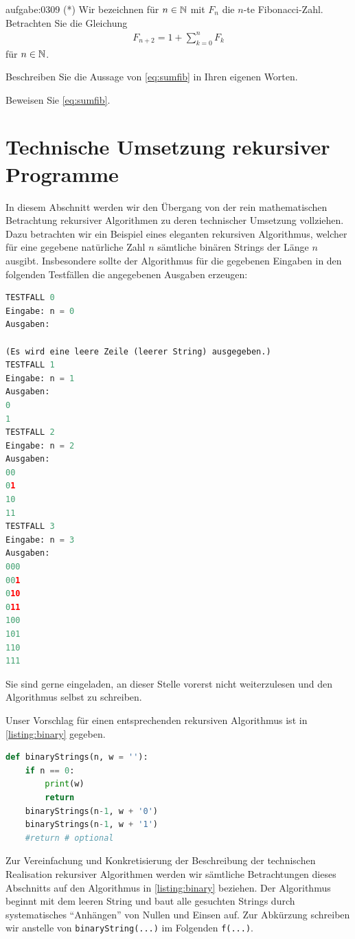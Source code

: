 \begin{aufgabe}{aufgabe:0309}
(*) Wir bezeichnen für $n\in\mathbb{N}$ mit $F_n$ die $n$-te Fibonacci-Zahl. Betrachten Sie die Gleichung
\begin{align}\label{eq:sumfib}
    F_{n+2} = 1 + \sum_{k=0}^{n} F_k
\end{align}
für $n\in\mathbb{N}$.
\begin{aenum}
    \item Beschreiben Sie die Aussage von \cref{eq:sumfib} in Ihren eigenen Worten.
    \item Beweisen Sie \cref{eq:sumfib}.
\end{aenum}
\end{aufgabe}

\clearpage
\section{Technische Umsetzung rekursiver Programme}\label{technisch}
In diesem Abschnitt werden wir den Übergang von der rein mathematischen Betrachtung rekursiver Algorithmen zu deren technischer Umsetzung vollziehen. Dazu betrachten wir ein Beispiel eines eleganten rekursiven Algorithmus, welcher für eine gegebene natürliche Zahl $n$ sämtliche binären Strings der Länge $n$ ausgibt. Insbesondere sollte der Algorithmus für die gegebenen Eingaben in den folgenden Testfällen die angegebenen Ausgaben erzeugen:
\begin{lstlisting}[language=Python,caption=binäre Strings rekursiv ausgeben,numbers=none]
TESTFALL 0
Eingabe: n = 0
Ausgaben:

(Es wird eine leere Zeile (leerer String) ausgegeben.)
TESTFALL 1
Eingabe: n = 1
Ausgaben:
0
1
TESTFALL 2
Eingabe: n = 2
Ausgaben:
00
01
10
11
TESTFALL 3
Eingabe: n = 3
Ausgaben:
000
001
010
011
100
101
110
111
\end{lstlisting}
Sie sind gerne eingeladen, an dieser Stelle vorerst nicht weiterzulesen und den Algorithmus selbst zu schreiben.

Unser Vorschlag für einen entsprechenden rekursiven Algorithmus ist in \cref{listing:binary} gegeben.
\begin{lstlisting}[language=Python,caption=binaryStrings,label=listing:binary]
def binaryStrings(n, w = ''):
    if n == 0:
        print(w)
        return
    binaryStrings(n-1, w + '0')
    binaryStrings(n-1, w + '1')
    #return # optional
\end{lstlisting}
Zur Vereinfachung und Konkretisierung der Beschreibung der technischen Realisation rekursiver Algorithmen werden wir sämtliche Betrachtungen dieses Abschnitts auf den Algorithmus in \cref{listing:binary} beziehen. Der Algorithmus beginnt mit dem leeren String und baut alle gesuchten Strings durch systematisches \enquote{Anhängen} von Nullen und Einsen auf. Zur Abkürzung schreiben wir anstelle von \verb|binaryString(...)| im Folgenden \verb|f(...)|.

